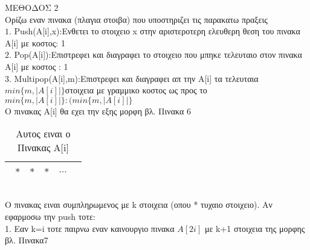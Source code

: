 \documentclass[12pt]{article}
\begin{document}
 ΜΕΘΟΔΟΣ 2$$ $$
 Ορίζω εναν πινακα (πλαγια στοιβα) που υποστηριζει τις παρακατω πραξεις $$ $$
$1. $ Push(A[i],x):Ενθετει το στοιχειο x στην αριστεροτερη ελευθερη θεση του πινακα Α[i] με κοστος: 1 $$ $$
$2. $ Pop(A[i]):Επιστρεφει και διαγραφει το στοιχειο που μπηκε τελευταιο στον πινακα Α[i] με κοστος : 1$$ $$
$3. $ Multipop(A[i],m):Επιστρεφει και διαγραφει απ την Α[i] τα τελευταια $ min\{m,|A[i]|\} $στοιχεια με γραμμικο κοστος ως προς το $min\{m,|A[i]|\}: (min\{m,|A[i]|\}$ $$ $$
$$ $$
Ο πινακας Α[i] θα εχει την εξης μορφη βλ. Πινακα 6
\begin{table}[H]
\begin{center}
\caption{Αυτος ειναι ο Πινακας A[i]}\label{tbl:1}
\begin{tabular}{|l|c|r|c|l|}
\hline
\ $*$ & $*$ & $*$ & $...$ & $  $\\
\hline
\end{tabular}
\end{center}
\end{table}
$$ $$

Ο πινακας ειναι συμπληρωμενος με k στοιχεια (οπου * τυχαιο στοιχειο).
Αν εφαρμοσω την push τοτε:$$ $$
1. Εαν k=i τοτε παιρνω εναν καινουργιο πινακα $A[2i]$ με k+1 στοιχεια  της μορφης βλ. Πινακα7$$ $$
\end{document}
